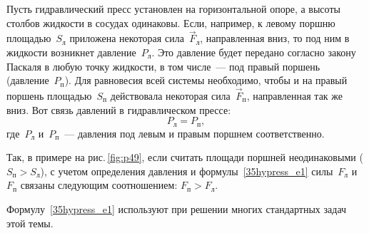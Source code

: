\documentclass[main.tex]{subfiles}
\begin{document}

Пусть гидравлический пресс установлен на горизонтальной опоре, а высоты столбов жидкости в сосудах одинаковы. Если, например, к левому поршню площадью~$S_\text{л}$ приложена некоторая сила~$\vec F_\text{л}$, направленная вниз, то под ним в жидкости возникнет давление~$P_\text{л}$. Это давление будет передано согласно закону Паскаля в любую точку жидкости, в том числе~--- под правый поршень (давление~$P_\text{п}$). Для равновесия всей системы необходимо, чтобы и на правый поршень площадью~$S_\text{п}$ действовала некоторая сила~$\vec F_\text{п}$, направленная так же вниз. Вот связь давлений в гидравлическом прессе:
\begin{equation}\label{35hypress_e1}
    P_\text{л}=P_\text{п},
\end{equation}
где~$P_\text{л}$ и~$P_\text{п}$~--- давления под левым и правым поршнем соответственно.

Так, в примере на рис.\,\ref{fig:p49}, если считать площади поршней неодинаковыми ($S_\text{п}>S_\text{л}$), с учетом определения давления и формулы~\eqref{35hypress_e1} силы~$F_\text{л}$ и~$F_\text{п}$ связаны следующим соотношением: $F_\text{п}>F_\text{л}$.

Формулу~\eqref{35hypress_e1} используют при решении многих стандартных задач этой темы. 

\medskip

\end{document}
